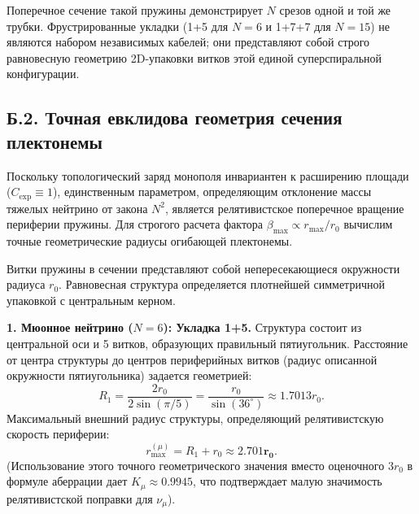 \documentclass[11pt,a4paper]{article}
\begin{document}
	Поперечное сечение такой пружины демонстрирует $N$ срезов одной и той же трубки. Фрустрированные укладки (1+5 для $N=6$ и 1+7+7 для $N=15$) не являются набором независимых кабелей; они представляют собой строго равновесную геометрию 2D-упаковки витков этой единой суперспиральной конфигурации.
	
	\subsection*{Б.2. Точная евклидова геометрия сечения плектонемы}
	Поскольку топологический заряд монополя инвариантен к расширению площади ($C_{\text{exp}} \equiv 1$), единственным параметром, определяющим отклонение массы тяжелых нейтрино от закона $N^2$, является релятивистское поперечное вращение периферии пружины. Для строгого расчета фактора $\beta_{\text{max}} \propto r_{\text{max}}/r_0$ вычислим точные геометрические радиусы огибающей плектонемы.
	
	Витки пружины в сечении представляют собой непересекающиеся окружности радиуса $r_0$. Равновесная структура определяется плотнейшей симметричной упаковкой с центральным керном.
	
	\textbf{1. Мюонное нейтрино ($N=6$): Укладка 1+5.}
	Структура состоит из центральной оси и 5 витков, образующих правильный пятиугольник. Расстояние от центра структуры до центров периферийных витков (радиус описанной окружности пятиугольника) задается геометрией:
	\begin{equation}
		R_1 = \frac{2 r_0}{2 \sin(\pi/5)} = \frac{r_0}{\sin(36^\circ)} \approx 1.7013 r_0.
	\end{equation}
	Максимальный внешний радиус структуры, определяющий релятивистскую скорость периферии:
	\begin{equation}
		r_{\text{max}}^{(\mu)} = R_1 + r_0 \approx \mathbf{2.701 r_0}.
	\end{equation}
	(Использование этого точного геометрического значения вместо оценочного $3r_0$ в формуле аберрации дает $K_\mu \approx 0.9945$, что подтверждает малую значимость релятивистской поправки для $\nu_\mu$).
	
\end{document}

